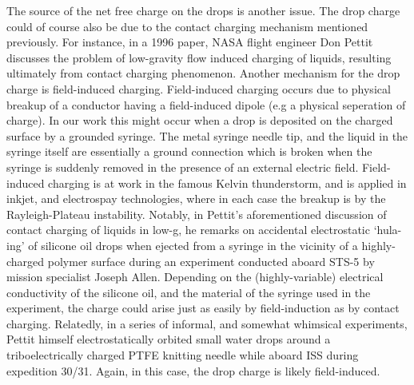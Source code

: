 \documentclass[12pt,a4paper,oneside]{book}
\begin{document}
The source of the net free charge on the drops is another issue. The drop charge could of course also be due to the contact charging mechanism mentioned previously. For instance, in a 1996 paper, NASA flight engineer Don Pettit discusses the problem of low-gravity flow induced charging of liquids, resulting ultimately from contact charging phenomenon\cite{pettit_donald_flow_????}. Another mechanism for the drop charge is field-induced charging. Field-induced charging occurs due to physical breakup of a conductor having a field-induced dipole (e.g a physical seperation of charge). In our work this might occur when a drop is deposited on the charged surface by a grounded syringe. The metal syringe needle tip, and the liquid in the syringe itself are essentially a ground connection which is broken when the syringe is suddenly removed in the presence of an external electric field. Field-induced charging is at work in the famous Kelvin thunderstorm, and is applied in inkjet, and electrospay technologies, where in each case the breakup is by the Rayleigh-Plateau instability. Notably, in Pettit's aforementioned discussion of contact charging of liquids in low-g, he remarks on accidental electrostatic `hula-ing' of silicone oil drops when ejected from a syringe in the vicinity of a highly-charged polymer surface during an experiment conducted aboard STS-5 by mission specialist Joseph Allen\cite{pettit_donald_flow_????}. Depending on the (highly-variable) electrical conductivity of the silicone oil, and the material of the syringe used in the experiment, the charge could arise just as easily by field-induction as by contact charging. Relatedly, in a series of informal, and somewhat whimsical experiments, Pettit himself electrostatically orbited small water drops around a triboelectrically charged PTFE knitting needle while aboard ISS during expedition 30/31\cite{stevenson_electrostatic_2015}. Again, in this case, the drop charge is likely field-induced.  
\end{document}
